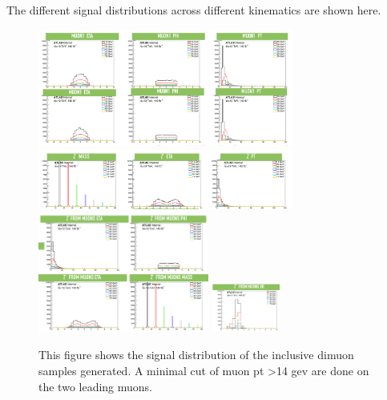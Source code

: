     The different signal distributions across different kinematics are shown here. 

\begin{figure}[!htb]
    \begin{center}
        \includegraphics[width=0.75\textwidth]{figures/chapter_dimuon/dimuondist1}
        \includegraphics[width=0.75\textwidth]{figures/chapter_dimuon/dimuondist2}
        \includegraphics[width=0.5\textwidth]{figures/chapter_dimuon/dimuondist3}
        \includegraphics[width=0.2\textwidth]{figures/chapter_dimuon/dimuondist4}
        \caption{
        This figure shows the signal distribution of the inclusive dimuon samples generated. A minimal cut of muon pt >14 gev are done on the two leading muons. }
        \label{fig:dimuon}
    \end{center}
\end{figure}


